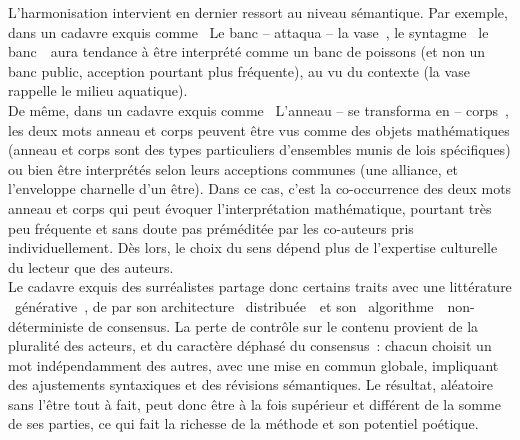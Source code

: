 \documentclass{article}
\begin{document}
				L'harmonisation intervient en dernier ressort au niveau sémantique. Par exemple, dans un cadavre exquis comme \guillemotleft~Le banc -- attaqua -- la vase~\guillemotright, le syntagme \guillemotleft~le banc~\guillemotright~aura tendance à être interprété comme un banc de poissons (et non un banc public, acception pourtant plus fréquente), au vu du contexte (la vase rappelle le milieu aquatique).\\
				De même, dans un cadavre exquis comme \guillemotleft~L'anneau -- se transforma en -- corps~\guillemotright, les deux mots anneau et corps peuvent être vus comme des objets mathématiques (anneau et corps sont des types particuliers d'ensembles munis de lois spécifiques) ou bien être interprétés selon leurs acceptions communes (une alliance, et l'enveloppe charnelle d'un être). Dans ce cas, c'est la co-occurrence des deux mots anneau et corps qui peut évoquer l'interprétation mathématique, pourtant très peu fréquente et sans doute pas préméditée par les co-auteurs pris individuellement. Dès lors, le choix du sens dépend plus de l'expertise culturelle du lecteur que des auteurs.\\
				
				Le cadavre exquis des surréalistes partage donc certains traits avec une littérature \guillemotleft~générative~\guillemotright, de par son architecture \guillemotleft~distribuée~\guillemotright~et son \guillemotleft~algorithme~\guillemotright~non-déterministe de consensus. La perte de contrôle sur le contenu provient de la pluralité des acteurs, et du caractère déphasé du consensus~: chacun choisit un mot indépendamment des autres, avec une mise en commun globale, impliquant des ajustements syntaxiques et des révisions sémantiques. Le résultat, aléatoire sans l'être tout à fait, peut donc être à la fois supérieur et différent de la somme de ses parties, ce qui fait la richesse de la méthode et son potentiel poétique.
				
\end{document}
